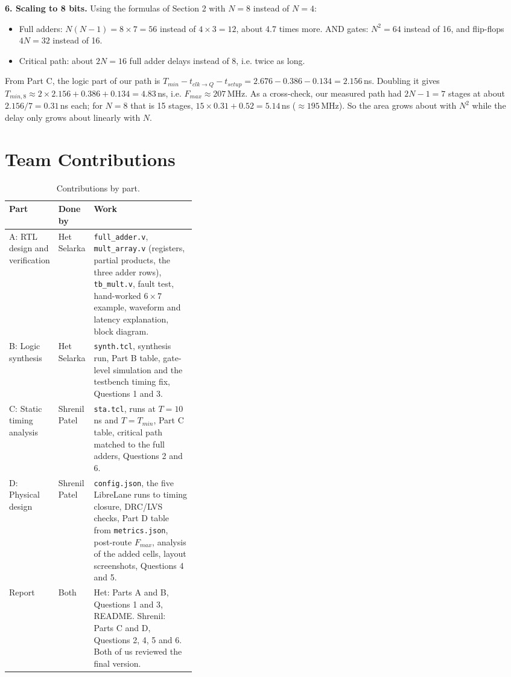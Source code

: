 \documentclass[11pt,a4paper]{article}
\begin{document}
\textbf{6. Scaling to 8 bits.}
Using the formulas of Section 2 with $N = 8$ instead of $N = 4$:
\begin{itemize}
  \item Full adders: $N(N-1) = 8 \times 7 = 56$ instead of $4 \times 3 = 12$, about 4.7 times
        more. AND gates: $N^2 = 64$ instead of 16, and flip-flops $4N = 32$ instead of 16.
  \item Critical path: about $2N = 16$ full adder delays instead of 8, i.e. twice as long.
\end{itemize}
From Part C, the logic part of our path is $T_{min} - t_{clk\to Q} - t_{setup} =
2.676 - 0.386 - 0.134 = 2.156$\,ns. Doubling it gives
$T_{min,8} \approx 2 \times 2.156 + 0.386 + 0.134 = 4.83$\,ns, i.e. $F_{max} \approx 207$\,MHz.
As a cross-check, our measured path had $2N - 1 = 7$ stages at about $2.156/7 = 0.31$\,ns each;
for $N = 8$ that is 15 stages, $15 \times 0.31 + 0.52 = 5.14$\,ns ($\approx 195$\,MHz). So the area
grows about with $N^2$ while the delay only grows about linearly with $N$.

\section{Team Contributions}

\begin{table}[H]
\centering
\begin{tabularx}{\linewidth}{@{}p{0.2\linewidth}p{0.16\linewidth}X@{}}
\toprule
Part & Done by & Work \\
\midrule
A: RTL design and verification & Het Selarka & \texttt{full\_adder.v}, \texttt{mult\_array.v}
  (registers, partial products, the three adder rows), \texttt{tb\_mult.v}, fault test, hand-worked
  $6 \times 7$ example, waveform and latency explanation, block diagram. \\
B: Logic synthesis & Het Selarka & \texttt{synth.tcl}, synthesis run, Part B table, gate-level
  simulation and the testbench timing fix, Questions 1 and 3. \\
C: Static timing analysis & Shrenil Patel & \texttt{sta.tcl}, runs at $T = 10$\,ns and
  $T = T_{min}$, Part C table, critical path matched to the full adders, Questions 2 and 6. \\
D: Physical design & Shrenil Patel & \texttt{config.json}, the five LibreLane runs to timing
  closure, DRC/LVS checks, Part D table from \texttt{metrics.json}, post-route $F_{max}$,
  analysis of the added cells, layout screenshots, Questions 4 and 5. \\
Report & Both & Het: Parts A and B, Questions 1 and 3, README. Shrenil: Parts C and D,
  Questions 2, 4, 5 and 6. Both of us reviewed the final version. \\
\bottomrule
\end{tabularx}
\caption{Contributions by part.}
\end{table}
\end{document}
